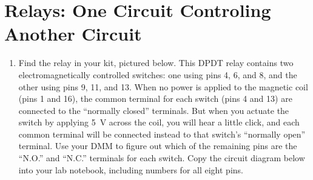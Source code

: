 \section{Relays: One Circuit Controling Another Circuit}
\label{lab_relays}


\bigskip

\begin{enumerate}[wide]

\item Find the relay in your kit, pictured below.
This DPDT relay contains two electromagnetically controlled switches: one using pins 4, 6, and 8, and the other using pins 9, 11, and 13.  
When no power is applied to the magnetic coil (pins 1 and 16), the common terminal for each switch (pins 4 and 13) are connected to the ``normally closed'' terminals.  
But when you actuate the switch by applying 5~V across the coil, you will hear a little click, and each common terminal will be connected instead to that switch's ``normally open'' terminal.  
Use your DMM to figure out which of the remaining pins are the ``N.O.'' and ``N.C.'' terminals for each switch.  Copy the circuit diagram below into your lab notebook, including numbers for all eight pins.


\end{enumerate}
